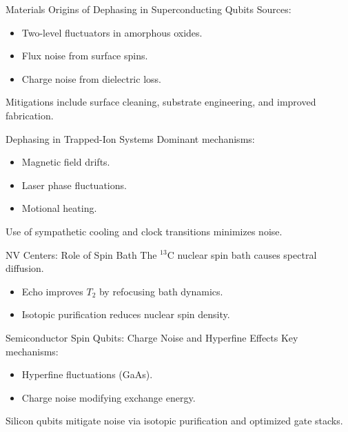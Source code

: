 \documentclass{beamer}
\begin{document}
  \begin{frame}{Materials Origins of Dephasing in Superconducting Qubits}
    Sources:
    \begin{itemize}
    \item Two-level fluctuators in amorphous oxides.
    \item Flux noise from surface spins.
    \item Charge noise from dielectric loss.
    \end{itemize}
    Mitigations include surface cleaning, substrate engineering, and improved fabrication.
  \end{frame}

  \begin{frame}{Dephasing in Trapped-Ion Systems}
    Dominant mechanisms:
    \begin{itemize}
    \item Magnetic field drifts.
    \item Laser phase fluctuations.
    \item Motional heating.
    \end{itemize}
    Use of sympathetic cooling and clock transitions minimizes noise.
  \end{frame}

  \begin{frame}{NV Centers: Role of Spin Bath}
    The $^{13}$C nuclear spin bath causes spectral diffusion.
    \begin{itemize}
    \item Echo improves $T_2$ by refocusing bath dynamics.
    \item Isotopic purification reduces nuclear spin density.
    \end{itemize}
  \end{frame}

  \begin{frame}{Semiconductor Spin Qubits: Charge Noise and Hyperfine Effects}
    Key mechanisms:
    \begin{itemize}
    \item Hyperfine fluctuations (GaAs).
    \item Charge noise modifying exchange energy.
    \end{itemize}
    Silicon qubits mitigate noise via isotopic purification and optimized gate stacks.
  \end{frame}
\end{document}
